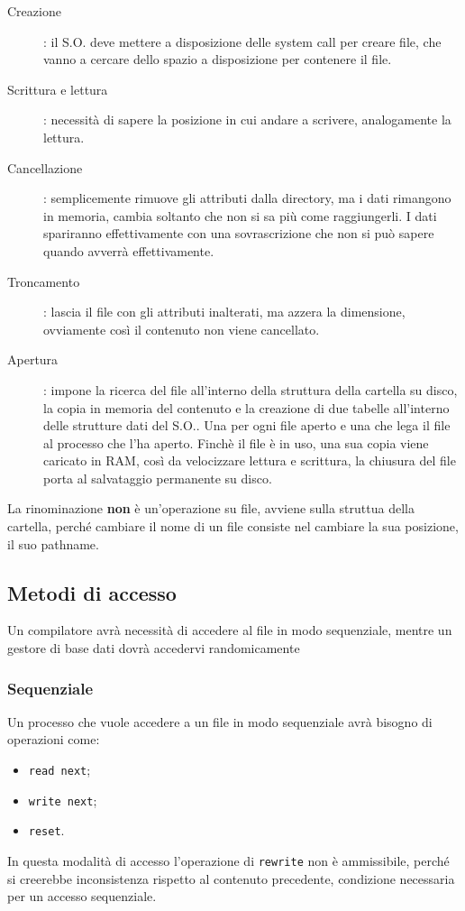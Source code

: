 \documentclass[a4paper, 12pt]{book}
\begin{document}
\begin{description}
    \item[Creazione]: il S.O. deve mettere a disposizione delle 
    system call per creare file, che vanno a cercare dello 
    spazio a disposizione per contenere il file.
    \item[Scrittura e lettura]: necessità di sapere la 
    posizione in cui andare a scrivere, analogamente la 
    lettura.
    \item[Cancellazione]: semplicemente rimuove gli 
    attributi dalla directory, ma i dati rimangono in memoria,
    cambia soltanto che non si sa più come raggiungerli.
    I dati spariranno effettivamente con una sovrascrizione
    che non si può sapere quando avverrà effettivamente.
    \item[Troncamento]: lascia il file con gli attributi 
    inalterati, ma azzera la dimensione, ovviamente così 
    il contenuto non viene cancellato.
    \item[Apertura]: impone la ricerca del file all'interno
    della struttura della cartella su disco, la copia in memoria 
    del contenuto e la creazione di due tabelle all'interno 
    delle strutture dati del S.O.. Una per ogni file aperto 
    e una che lega il file al processo che l'ha aperto.
    Finchè il file è in uso, una sua copia viene 
    caricato in RAM, così da velocizzare lettura e scrittura, 
    la chiusura del file porta al salvataggio permanente 
    su disco.
\end{description}
La rinominazione \textbf{non} è un'operazione su file, 
avviene sulla struttua della cartella, perché cambiare il 
nome di un file consiste nel cambiare la sua posizione, 
il suo pathname.

\subsection{Metodi di accesso}

Un compilatore avrà necessità di accedere al file in modo 
sequenziale, mentre un gestore di base dati dovrà accedervi 
randomicamente

\subsubsection{Sequenziale}

Un processo che vuole accedere a un file in modo sequenziale 
avrà bisogno di operazioni come:
\begin{itemize}
    \item \verb|read next|;
    \item \verb|write next|;
    \item \verb|reset|.
\end{itemize}
In questa modalità di accesso l'operazione di \verb|rewrite| 
non è ammissibile, perché si creerebbe inconsistenza rispetto 
al contenuto precedente, condizione necessaria per un accesso
sequenziale.
\end{document}
